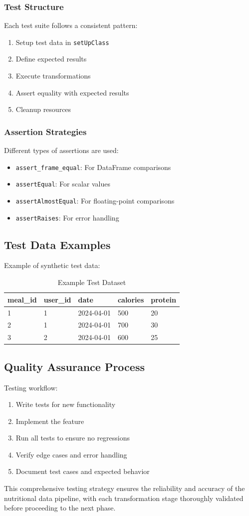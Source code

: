 \subsubsection{Test Structure}
Each test suite follows a consistent pattern:
\begin{enumerate}
    \item Setup test data in \texttt{setUpClass}
    \item Define expected results
    \item Execute transformations
    \item Assert equality with expected results
    \item Cleanup resources
\end{enumerate}

\subsubsection{Assertion Strategies}
Different types of assertions are used:
\begin{itemize}
    \item \texttt{assert\_frame\_equal}: For DataFrame comparisons
    \item \texttt{assertEqual}: For scalar values
    \item \texttt{assertAlmostEqual}: For floating-point comparisons
    \item \texttt{assertRaises}: For error handling
\end{itemize}

\subsection{Test Data Examples}
Example of synthetic test data:

\begin{table}[h]
    \centering
    \begin{tabular}{|l|l|l|l|l|}
        \hline
        \textbf{meal\_id} & \textbf{user\_id} & \textbf{date} & \textbf{calories} & \textbf{protein} \\
        \hline
        1 & 1 & 2024-04-01 & 500 & 20 \\
        2 & 1 & 2024-04-01 & 700 & 30 \\
        3 & 2 & 2024-04-01 & 600 & 25 \\
        \hline
    \end{tabular}
    \caption{Example Test Dataset}
\end{table}

\subsection{Quality Assurance Process}
Testing workflow:
\begin{enumerate}
    \item Write tests for new functionality
    \item Implement the feature
    \item Run all tests to ensure no regressions
    \item Verify edge cases and error handling
    \item Document test cases and expected behavior
\end{enumerate}

This comprehensive testing strategy ensures the reliability and accuracy of the nutritional data pipeline, with each transformation stage thoroughly validated before proceeding to the next phase.
